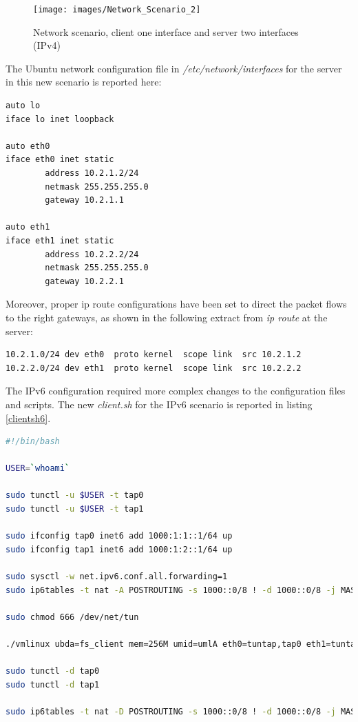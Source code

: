 \begin{figure}[!htb]
\centering
\texttt{[image: images/Network\_Scenario\_2]}
\caption{Network scenario, client one interface and server two interfaces (IPv4)}
\label{fig:network2}
\end{figure} 


The Ubuntu network configuration file in \textit{/etc/network/interfaces} for the server in this new scenario is reported here:

\begin{verbatim}
auto lo
iface lo inet loopback

auto eth0
iface eth0 inet static
        address 10.2.1.2/24
        netmask 255.255.255.0
        gateway 10.2.1.1

auto eth1
iface eth1 inet static
        address 10.2.2.2/24
        netmask 255.255.255.0
        gateway 10.2.2.1
\end{verbatim}

Moreover, proper ip route configurations have been set to direct the packet flows to the right gateways, as shown in the following extract from \textit{ip route} at the server:

\begin{verbatim}
10.2.1.0/24 dev eth0  proto kernel  scope link  src 10.2.1.2 
10.2.2.0/24 dev eth1  proto kernel  scope link  src 10.2.2.2 
\end{verbatim}
 
The IPv6 configuration required more complex changes to the configuration files and scripts. The new \textit{client.sh} for the IPv6 scenario is reported in listing \ref{clientsh6}.


\begin{lstlisting}[language=bash, caption=\textit{client.sh for IPv6 setup}, label=clientsh6]
#!/bin/bash

USER=`whoami`

sudo tunctl -u $USER -t tap0
sudo tunctl -u $USER -t tap1

sudo ifconfig tap0 inet6 add 1000:1:1::1/64 up
sudo ifconfig tap1 inet6 add 1000:1:2::1/64 up

sudo sysctl -w net.ipv6.conf.all.forwarding=1
sudo ip6tables -t nat -A POSTROUTING -s 1000::0/8 ! -d 1000::0/8 -j MASQUERADE

sudo chmod 666 /dev/net/tun

./vmlinux ubda=fs_client mem=256M umid=umlA eth0=tuntap,tap0 eth1=tuntap,tap1

sudo tunctl -d tap0
sudo tunctl -d tap1

sudo ip6tables -t nat -D POSTROUTING -s 1000::0/8 ! -d 1000::0/8 -j MASQUERADE
\end{lstlisting}

